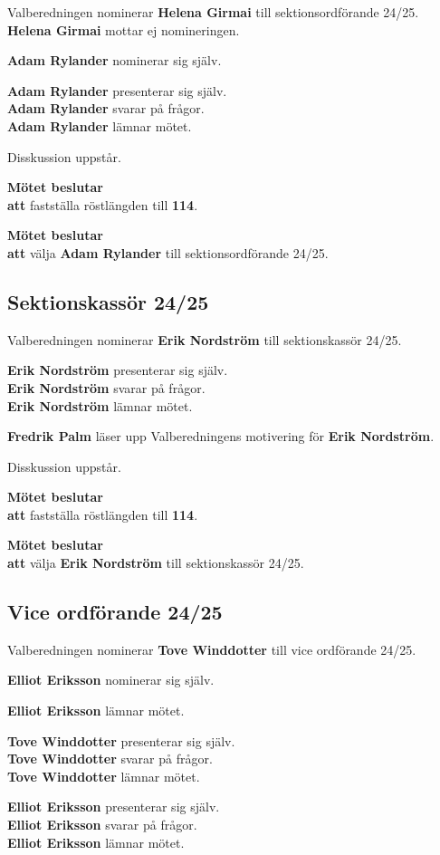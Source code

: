 \documentclass{datateknologsektionen-document}
\newcommand{\ind}{\hspace*{2em}}
\newcommand{\motetbeslutar}{\textbf{Mötet beslutar}}
\newcommand{\att}{\\\ind\textbf{att}}
\newcommand{\rostlangd}[1]{\motetbeslutar\att{} fastställa röstlängden till \textbf{#1}.}
\begin{document}
Valberedningen nominerar \textbf{Helena Girmai} till sektionsordförande 24/25. \\
\textbf{Helena Girmai} mottar ej nomineringen.

\textbf{Adam Rylander} nominerar sig själv.

\textbf{Adam Rylander} presenterar sig själv.\\
\textbf{Adam Rylander} svarar på frågor.\\
\textbf{Adam Rylander} lämnar mötet.

Disskussion uppstår.

\rostlangd{114}

\motetbeslutar\att{} välja \textbf{Adam Rylander} till sektionsordförande 24/25.

\subsection{Sektionskassör 24/25}

Valberedningen nominerar \textbf{Erik Nordström} till sektionskassör 24/25.

\textbf{Erik Nordström} presenterar sig själv.\\
\textbf{Erik Nordström} svarar på frågor.\\
\textbf{Erik Nordström} lämnar mötet.

\textbf{Fredrik Palm} läser upp Valberedningens motivering för \textbf{Erik Nordström}.

Disskussion uppstår.

\rostlangd{114}

\motetbeslutar\att{} välja \textbf{Erik Nordström} till sektionskassör 24/25.

\subsection{Vice ordförande 24/25}

Valberedningen nominerar \textbf{Tove Winddotter} till vice ordförande 24/25.

\textbf{Elliot Eriksson} nominerar sig själv.

\textbf{Elliot Eriksson} lämnar mötet.

\textbf{Tove Winddotter} presenterar sig själv.\\
\textbf{Tove Winddotter} svarar på frågor.\\
\textbf{Tove Winddotter} lämnar mötet.

\textbf{Elliot Eriksson} presenterar sig själv.\\
\textbf{Elliot Eriksson} svarar på frågor.\\
\textbf{Elliot Eriksson} lämnar mötet.
\end{document}
